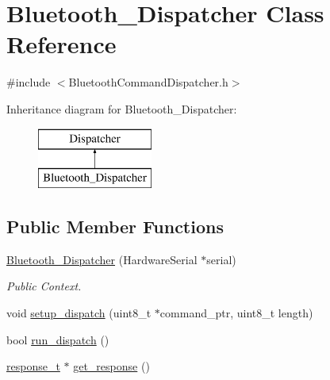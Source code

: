 \hypertarget{class_bluetooth___dispatcher}{\section{\-Bluetooth\-\_\-\-Dispatcher \-Class \-Reference}
\label{class_bluetooth___dispatcher}
}


{\ttfamily \#include $<$\-Bluetooth\-Command\-Dispatcher.\-h$>$}

\-Inheritance diagram for \-Bluetooth\-\_\-\-Dispatcher\-:\begin{figure}[H]
\begin{center}
\leavevmode
\includegraphics[height=2.000000cm]{class_bluetooth___dispatcher}
\end{center}
\end{figure}
\subsection*{\-Public \-Member \-Functions}
\begin{DoxyCompactItemize}
\item 
\hyperlink{class_bluetooth___dispatcher_a9831e970fe092adc85d2cc3426052392}{\-Bluetooth\-\_\-\-Dispatcher} (\-Hardware\-Serial $\ast$serial)
\begin{DoxyCompactList}\small\item\em \-Public \-Context. \end{DoxyCompactList}\item 
void \hyperlink{class_bluetooth___dispatcher_a8cf1e22a7e599c1fa8d6741b7b267b3b}{setup\-\_\-dispatch} (uint8\-\_\-t $\ast$command\-\_\-ptr, uint8\-\_\-t length)
\item 
bool \hyperlink{class_bluetooth___dispatcher_a9de32e4c1d450d101738185124a873a8}{run\-\_\-dispatch} ()
\item 
\hyperlink{structresponse__t}{response\-\_\-t} $\ast$ \hyperlink{class_bluetooth___dispatcher_ab7974859a1f0150b6d0861c7200b9e7d}{get\-\_\-response} ()
\end{DoxyCompactItemize}
